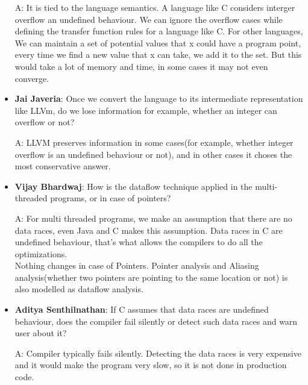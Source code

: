 \begin{itemize}
    A: It is tied to the language semantics. A language like C considers interger overflow an undefined behaviour. We can ignore the overflow cases while defining the transfer function rules for a language like C. For other languages, We can maintain a set of potential values that x could have a program point, every time we find a new value that x can take, we add it to the set. But this would take a lot of memory and time, in some cases it may not even converge.
    
    \item \textbf{Jai Javeria}: Once we convert the language to its intermediate representation like LLVm, do we lose information for example, whether an integer can overflow or not?
    
    A: LLVM preserves information in some cases(for example, whether integer overflow is an undefined behaviour or not), and in other cases it choses the most conservative answer. 
    
    \item \textbf{Vijay Bhardwaj}: How is the dataflow technique applied in the multi-threaded programs, or in case of pointers?
    
    A: For multi threaded programs, we make an assumption that there are no data races, even Java and C makes this assumption. Data races in C are undefined behaviour, that's what allows the compilers to do all the optimizations.\\
    Nothing changes in case of Pointers. Pointer analysis and Aliasing analysis(whether two pointers are pointing to the same location or not) is also modelled as dataflow analysis.
    
    \item \textbf{Aditya Senthilnathan}: If C assumes that data races are undefined behaviour, does the compiler fail silently or detect such data races and warn user about it?
    
    A: Compiler typically fails silently. Detecting the data races is very expensive and it would make the program very slow, so it is not done in production code. 
\end{itemize}

